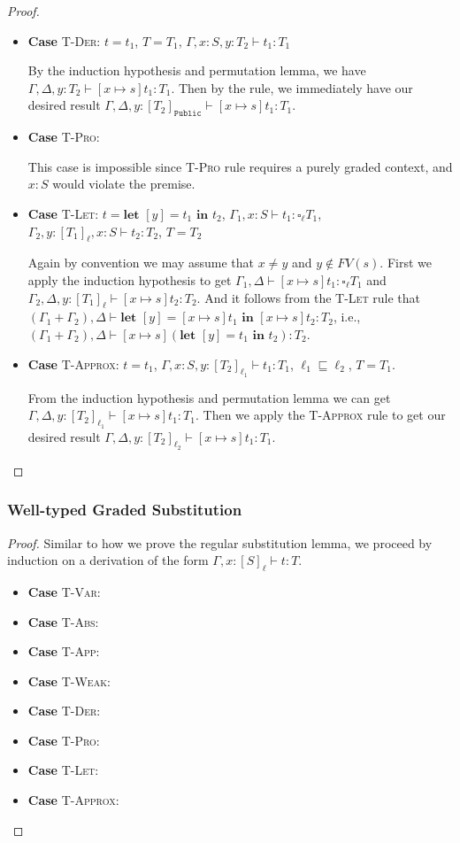 \documentclass[conference]{IEEEtran}
\newcommand\unp[3]{\textbf{let }[#1]=#2\textbf{ in }#3}
\newcommand\gradedt[2]{\square_#1 #2}
\newcommand\public{\texttt{Public}}
\begin{document}
\begin{proof}
\begin{itemize}
		\item\textbf{Case} \textsc{T-Der}: $t=t_1$, $T=T_1$, $\Gamma,x:S,y:T_2\vdash t_1:T_1$
		
		By the induction hypothesis and permutation lemma, we have $\Gamma,\Delta,y:T_2\vdash [x\mapsto s]t_1:T_1$. Then by the  rule, we immediately have our desired result $\Gamma,\Delta,y:[T_2]_\public\vdash [x\mapsto s]t_1:T_1$.
		
		\item\textbf{Case} \textsc{T-Pro}:
		
		This case is impossible since \textsc{T-Pro} rule requires a purely graded context, and $x:S$ would violate the premise.
		
		\item\textbf{Case} \textsc{T-Let}: $t=\unp{y}{t_1}{t_2}$, $\Gamma_1,x:S\vdash t_1:\gradedt{\ell}{T_1}$, $\Gamma_2,y:[T_1]_\ell,x:S\vdash t_2:T_2$, $T=T_2$
		
		Again by convention we may assume that $x\ne y$ and $y\notin FV(s)$. First we apply the induction hypothesis to get $\Gamma_1,\Delta\vdash [x\mapsto s]t_1:\gradedt{\ell}{T_1}$ and $\Gamma_2,\Delta,y:[T_1]_\ell\vdash [x\mapsto s]t_2:T_2$. And it follows from the \textsc{T-Let} rule that $(\Gamma_1+\Gamma_2),\Delta\vdash\unp{y}{[x\mapsto s]t_1}{[x\mapsto s]t_2}:T_2$, i.e., $(\Gamma_1+\Gamma_2),\Delta\vdash[x\mapsto s](\unp{y}{t_1}{t_2}):T_2$.
		
		\item\textbf{Case} \textsc{T-Approx}: $t=t_1$, $\Gamma,x:S,y:[T_2]_{\ell_1}\vdash t_1:T_1$, $\ell_1\sqsubseteq\ell_2$, $T=T_1$.
		
		From the induction hypothesis and permutation lemma we can get $\Gamma,\Delta,y:[T_2]_{\ell_1}\vdash[x\mapsto s]t_1:T_1$. Then we apply the \textsc{T-Approx} rule to get our desired result $\Gamma,\Delta,y:[T_2]_{\ell_2}\vdash[x\mapsto s]t_1:T_1$.
	\end{itemize}
\end{proof}

\subsubsection{Well-typed Graded Substitution}
\begin{proof}
	Similar to how we prove the regular substitution lemma, we proceed by induction on a derivation of the form $\Gamma,x:[S]_\ell\vdash t:T$.
    \begin{itemize}
        \item \textbf{Case} \textsc{T-Var}:
        \item \textbf{Case} \textsc{T-Abs}:
        \item \textbf{Case} \textsc{T-App}:
        \item \textbf{Case} \textsc{T-Weak}:
        \item \textbf{Case} \textsc{T-Der}:
        \item \textbf{Case} \textsc{T-Pro}:
        \item \textbf{Case} \textsc{T-Let}:
        \item \textbf{Case} \textsc{T-Approx}:
    \end{itemize}
\end{proof}
\end{document}
